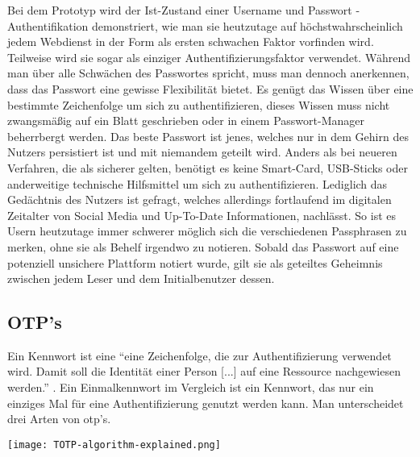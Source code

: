 Bei dem Prototyp wird der Ist-Zustand einer Username und Passwort - Authentifikation demonstriert, wie man sie heutzutage auf höchstwahrscheinlich jedem Webdienst in der Form als ersten schwachen Faktor vorfinden wird. Teilweise wird sie sogar als einziger Authentifizierungsfaktor verwendet. Während man über alle Schwächen des Passwortes spricht, muss man dennoch anerkennen, dass das Passwort eine gewisse Flexibilität bietet. Es genügt das Wissen über eine bestimmte Zeichenfolge um sich zu authentifizieren, dieses Wissen muss nicht zwangsmäßig auf ein Blatt geschrieben oder in einem Passwort-Manager beherrbergt werden. Das beste Passwort ist jenes, welches nur in dem Gehirn des Nutzers persistiert ist und mit niemandem geteilt wird. Anders als bei neueren Verfahren, die als sicherer gelten, benötigt es keine Smart-Card, USB-Sticks oder anderweitige technische Hilfsmittel um sich zu authentifizieren. Lediglich das Gedächtnis des Nutzers ist gefragt, welches allerdings fortlaufend im digitalen Zeitalter von Social Media und Up-To-Date Informationen, nachlässt. So ist es Usern heutzutage immer schwerer möglich sich die verschiedenen Passphrasen zu merken, ohne sie als Behelf irgendwo zu notieren. Sobald das Passwort auf eine potenziell unsichere Plattform notiert wurde, gilt sie als geteiltes Geheimnis zwischen jedem Leser und dem Initialbenutzer dessen.
\newpage

\subsection{OTP's}
Ein Kennwort ist eine ``eine Zeichenfolge, die zur Authentifizierung verwendet wird. Damit soll die Identität einer Person [...] auf eine Ressource nachgewiesen werden.'' \cite{A4}. Ein Einmalkennwort im Vergleich ist ein Kennwort, das nur ein einziges Mal für eine Authentifizierung genutzt werden kann. Man unterscheidet drei Arten von \ac{otp}'s.

\texttt{[image: TOTP-algorithm-explained.png]}

